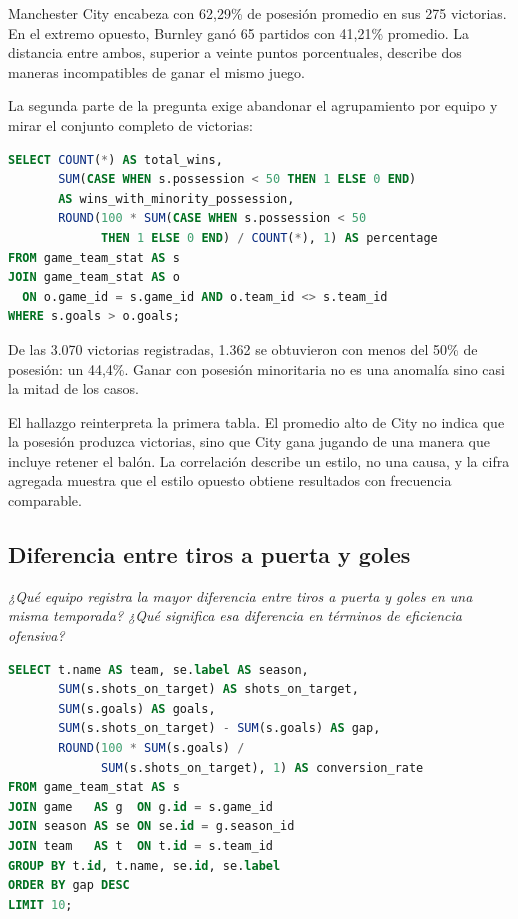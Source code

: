 \documentclass[conference]{IEEEtran}
\begin{document}
Manchester City encabeza con 62,29\% de posesión promedio en sus 275 victorias.
En el extremo opuesto, Burnley ganó 65 partidos con 41,21\% promedio. La
distancia entre ambos, superior a veinte puntos porcentuales, describe dos
maneras incompatibles de ganar el mismo juego.

La segunda parte de la pregunta exige abandonar el agrupamiento por equipo y
mirar el conjunto completo de victorias:

\begin{lstlisting}[language=SQL]
SELECT COUNT(*) AS total_wins,
       SUM(CASE WHEN s.possession < 50 THEN 1 ELSE 0 END)
       AS wins_with_minority_possession,
       ROUND(100 * SUM(CASE WHEN s.possession < 50
             THEN 1 ELSE 0 END) / COUNT(*), 1) AS percentage
FROM game_team_stat AS s
JOIN game_team_stat AS o
  ON o.game_id = s.game_id AND o.team_id <> s.team_id
WHERE s.goals > o.goals;
\end{lstlisting}

De las 3.070 victorias registradas, 1.362 se obtuvieron con menos del 50\% de
posesión: un 44,4\%. Ganar con posesión minoritaria no es una anomalía sino
casi la mitad de los casos.

El hallazgo reinterpreta la primera tabla. El promedio alto de City no indica
que la posesión produzca victorias, sino que City gana jugando de una manera
que incluye retener el balón. La correlación describe un estilo, no una causa,
y la cifra agregada muestra que el estilo opuesto obtiene resultados con
frecuencia comparable.

\subsection{Diferencia entre tiros a puerta y goles}

\emph{¿Qué equipo registra la mayor diferencia entre tiros a puerta y goles en
una misma temporada? ¿Qué significa esa diferencia en términos de eficiencia
ofensiva?}

\begin{lstlisting}[language=SQL]
SELECT t.name AS team, se.label AS season,
       SUM(s.shots_on_target) AS shots_on_target,
       SUM(s.goals) AS goals,
       SUM(s.shots_on_target) - SUM(s.goals) AS gap,
       ROUND(100 * SUM(s.goals) /
             SUM(s.shots_on_target), 1) AS conversion_rate
FROM game_team_stat AS s
JOIN game   AS g  ON g.id = s.game_id
JOIN season AS se ON se.id = g.season_id
JOIN team   AS t  ON t.id = s.team_id
GROUP BY t.id, t.name, se.id, se.label
ORDER BY gap DESC
LIMIT 10;
\end{lstlisting}
\end{document}
